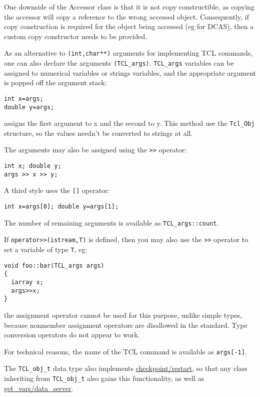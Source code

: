 One downside of the Accessor class is that it is not copy
constructible, as copying the accessor will copy a reference to the
wrong accessed object. Consequently, if copy construction is required
for the object being accessed (eg for DCAS), then a custom copy
constructor needs to be provided.

As an alternative to \verb+(int,char**)+ arguments for implementing
TCL commands, one can also declare the arguments
\verb+(TCL_args)+. \verb+TCL_args+ variables can be
assigned to numerical variables or strings variables, and the
appropriate argument is popped off the argument stack:
\begin{verbatim}
int x=args;
double y=args;
\end{verbatim}
assigns the first argument to x and the second to y. This method use
the \verb+Tcl_Obj+ structure, so the values needn't be converted to
strings at all.

The arguments may also be assigned using the \verb+>>+ operator:
\begin{verbatim}
int x; double y;
args >> x >> y;
\end{verbatim}

A third style uses the \verb+[]+ operator:
\begin{verbatim}
int x=args[0]; double y=args[1];
\end{verbatim}
The number of remaining arguments is available as
\verb+TCL_args::count+.

If \verb+operator>>(istream,T)+ is defined, then you may also use the
\verb+>>+ operator to set a variable of type \verb+T+, eg:
\begin{verbatim}
void foo::bar(TCL_args args)
{
  iarray x;
  args>>x;
}
\end{verbatim}
the assignment operator cannot be used for this purpose, unlike simple
types, because nonmember assignment operators are disallowed in the
standard. Type conversion operators do not appear to work.

For technical reasons, the name of the TCL command is available as
\verb+args[-1]+. 

The {\tt TCL\_obj\_t} data type also implements \hyperref{checkpoint
  and restart functions}{checkpoint and restart
  functions (\S}{)}{checkpoint/restart},
so that any class inheriting from {\tt TCL\_obj\_t}
also gains this functionality, as well as \hyperref{client-server
  functionality}{\S(}{)}{get_vars/data_server}.

